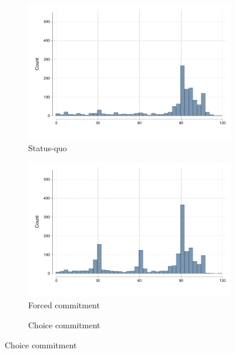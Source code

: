 \begin{figure}[H]
    \caption{Histogram of payments}
    \label{hist_payments}
    \begin{center}
    \begin{subfigure}{0.31\textwidth}
        \caption{Status-quo}
        \centering
    \includegraphics[width=\textwidth]{Figuras/hist_payments_sq.pdf}
    \end{subfigure}
    \begin{subfigure}{0.31\textwidth}
        \caption{Forced commitment}
        \centering
    \includegraphics[width=\textwidth]{Figuras/hist_payments_fc.pdf}
    \end{subfigure}
    \begin{subfigure}{0.31\textwidth}
        \caption{Choice commitment}
        \centering

\end{subfigure}
\end{center}
\end{figure}
